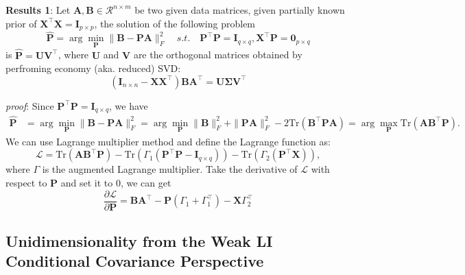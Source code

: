 \documentclass[titlepage,11pt,twoside]{article}
\begin{document}
\textbf{Results 1}: Let $\mathbf{A},\mathbf{B}\in \mathcal{R}^{n\times m}$ be two given data matrices, given partially known prior of $\mathbf{X}^{\top}\mathbf{X}=\mathbf{I}_{p\times p}$, the solution of the following problem
\begin{equation}
\mathbf{\hat{P}}=\arg\min_{\mathbf{P}}\|\mathbf{B}-\mathbf{P}\mathbf{A}\|_{F}^{2}
\quad
s.t.
\quad
\mathbf{P}^{\top}\mathbf{P} = \mathbf{I}_{q\times q}, \mathbf{X}^{\top}\mathbf{P} = \mathbf{0}_{p\times q} 
\end{equation}
is $\mathbf{\hat{P}} = \mathbf{U}\mathbf{V}^{\top}$, where $\mathbf{U}$ and $\mathbf{V}$ are the orthogonal matrices obtained by perfroming economy (aka. reduced) SVD:
\begin{equation}
(\mathbf{I}_{n\times n}-\mathbf{X}\mathbf{X}^{\top})\mathbf{B}\mathbf{A}^{\top} = \mathbf{U}\mathbf{\Sigma}\mathbf{V}^{\top}
\end{equation}

\emph{proof}: 
Since $\mathbf{P}^{\top}\mathbf{P} = \mathbf{I}_{q\times q}$, we have
\begin{equation}
\begin{split}
\mathbf{\hat{P}}
&
=\arg\min_{\mathbf{P}}\|\mathbf{B}-\mathbf{P}\mathbf{A}\|_{F}^{2}
=\arg\min_{\mathbf{P}}\|\mathbf{B}\|_{F}^{2}+\|\mathbf{P}\mathbf{A}\|_{F}^{2}-2\text{Tr}(\mathbf{B}^{\top}\mathbf{P}\mathbf{A})
=\arg\max_{\mathbf{P}}\text{Tr}(\mathbf{A}\mathbf{B}^{\top}\mathbf{P}).
\end{split}
\end{equation}
We can use Lagrange multiplier method and define the Lagrange function as:
\begin{equation}
\mathcal{L}
=
\text{Tr}(\mathbf{A}\mathbf{B}^{\top}\mathbf{P})
-
\text{Tr}(\Gamma_{1}(\mathbf{P}^{\top}\mathbf{P} - \mathbf{I}_{q\times q}))
-
\text{Tr}(\Gamma_{2}(\mathbf{P}^{\top}\mathbf{X}))
,
\end{equation}
where $\Gamma$ is the augmented Lagrange multiplier. Take the derivative of $\mathcal{L}$ with respect to $\mathbf{P}$ and set it to 0, we can get
\begin{equation}
\frac{\partial \mathcal{L}}{\partial \mathbf{P}} 
=
\mathbf{B}\mathbf{A}^{\top}
-
\mathbf{P}(\Gamma_{1}+\Gamma_{1}^{\top})
-
\mathbf{X}\Gamma_{2}^{\top}
\end{equation}

\subsection{Unidimensionality from the Weak LI Conditional Covariance Perspective}
\end{document}
